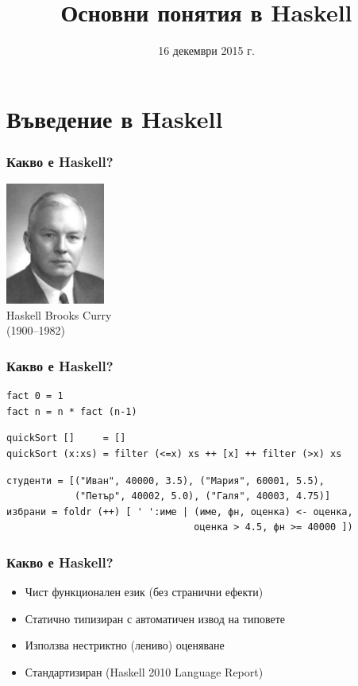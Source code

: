 \documentclass{beamer}
\title{Основни понятия в Haskell}
\date{16 декември 2015 г.}
\begin{document}
\begin{frame}
  \titlepage
\end{frame}


\section{Въведение в Haskell}

\begin{frame}
  \frametitle{Какво е Haskell?}
  \pause
  \begin{center}
    \includegraphics[height=4cm]{images/HaskellBCurry.jpg}\\
    Haskell Brooks Curry\\
    (1900--1982)
  \end{center}
\end{frame}

\begin{frame}[fragile]
  \frametitle{Какво е Haskell?}
  \pause
\begin{verbatim}
fact 0 = 1
fact n = n * fact (n-1)
\end{verbatim}
  \pause
\begin{verbatim}
quickSort []     = []
quickSort (x:xs) = filter (<=x) xs ++ [x] ++ filter (>x) xs
\end{verbatim}
  \pause
\begin{verbatim}
студенти = [("Иван", 40000, 3.5), ("Мария", 60001, 5.5),
            ("Петър", 40002, 5.0), ("Галя", 40003, 4.75)]
избрани = foldr (++) [ ' ':име | (име, фн, оценка) <- оценка,
                                 оценка > 4.5, фн >= 40000 ])
\end{verbatim}
\end{frame}

\begin{frame}
  \frametitle{Какво е Haskell?}
  \pause
  \begin{itemize}
  \item Чист функционален език (без странични ефекти)
  \item Статично типизиран с автоматичен извод на типовете
  \item Използва нестриктно (лениво) оценяване
  \item Стандартизиран (Haskell 2010 Language Report)
  \end{itemize}
\end{frame}
\end{document}
